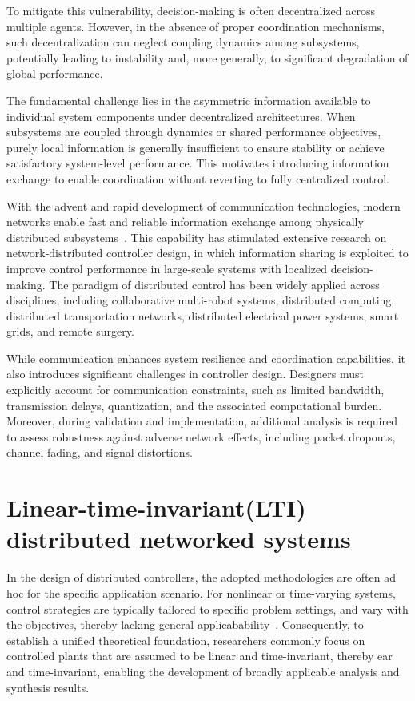 To mitigate this vulnerability, decision-making is often decentralized across multiple agents. However, in the absence of proper coordination mechanisms, such decentralization can neglect coupling dynamics among subsystems, potentially leading to instability and, more generally, to significant degradation of global performance.

The fundamental challenge lies in the asymmetric information available to individual system components under decentralized architectures. When subsystems are coupled through dynamics or shared performance objectives, purely local information is generally insufficient to ensure stability or achieve satisfactory system-level performance. This motivates introducing information exchange to enable coordination without reverting to fully centralized control.

With the advent and rapid development of communication technologies, modern networks enable fast and reliable information exchange among physically distributed subsystems~\cite{ge2017OverviewNCS}. This capability has stimulated extensive research on network-distributed controller design, in which information sharing is exploited to improve control performance in large-scale systems with localized decision-making. The paradigm of distributed control has been widely applied across disciplines, including collaborative multi-robot systems,  distributed computing, distributed transportation networks, distributed electrical power systems, smart grids, and remote surgery.

While communication enhances system resilience and coordination capabilities, it also introduces significant challenges in controller design. Designers must explicitly account for communication constraints, such as limited bandwidth, transmission delays, quantization, and the associated computational burden. Moreover, during validation and implementation, additional analysis is required to assess robustness against adverse network effects, including packet dropouts, channel fading, and signal distortions.


\section{Linear-time-invariant(LTI) distributed networked systems}

In the design of distributed controllers, the adopted methodologies are often ad hoc for the specific application scenario. For nonlinear or time-varying systems, control strategies are typically tailored to specific problem settings, and vary with the objectives, thereby lacking general applicabability~\cite{ge2017OverviewNCS}. Consequently, to establish a unified theoretical foundation, researchers commonly focus on controlled plants that are assumed to be linear and time-invariant, thereby ear and time-invariant, enabling the development of broadly applicable analysis and synthesis results.

